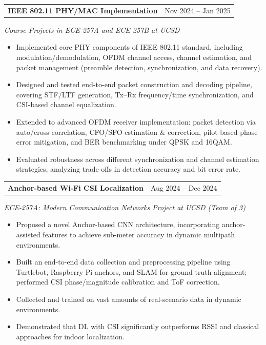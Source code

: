 \documentclass[10pt, letterpaper]{article}
\makeatletter
\newenvironment{highlights}{
    \begin{itemize}[
        topsep=0.10 cm,
        parsep=0.10 cm,
        partopsep=0pt,
        itemsep=0pt,
        leftmargin=0.4 cm + 10pt
    ]
}{
    \end{itemize}
} %
\newenvironment{projectentry}[3]{%
  \onecolentry
  \begin{tabular*}{\textwidth}{@{\extracolsep{\fill}} l r}
    \textbf{#1} & #2 \\
  \end{tabular*}
  \textit{#3} \par
  \vspace{0.2em} %
}{%
  \endonecolentry
}
\makeatother
\begin{document}
\begin{projectentry}{IEEE 802.11 PHY/MAC Implementation}{Nov 2024 -- Jan 2025}{Course Projects in ECE 257A and ECE 257B at UCSD}
    \begin{highlights}
        \item Implemented core PHY components of IEEE 802.11 standard, including modulation/demodulation, OFDM channel access, channel estimation, and packet management (preamble detection, synchronization, and data recovery).  
        \item Designed and tested end-to-end packet construction and decoding pipeline, covering STF/LTF generation, Tx–Rx frequency/time synchronization, and CSI-based channel equalization.  
        \item Extended to advanced OFDM receiver implementation: packet detection via auto/cross-correlation, CFO/SFO estimation \& correction, pilot-based phase error mitigation, and BER benchmarking under QPSK and 16QAM.  
        \item Evaluated robustness across different synchronization and channel estimation strategies, analyzing trade-offs in detection accuracy and bit error rate.
    \end{highlights}
\end{projectentry}



\begin{projectentry}{Anchor-based Wi-Fi CSI Localization}{Aug 2024 -- Dec 2024}{ECE-257A: Modern Communication Networks Project at UCSD (Team of 3)}
    \begin{highlights}
        \item Proposed a novel Anchor-based CNN architecture, incorporating anchor-assisted features to achieve sub-meter accuracy in dynamic multipath environments. 
        \item Built an end-to-end data collection and preprocessing pipeline using Turtlebot, Raspberry Pi anchors, and SLAM for ground-truth alignment; performed CSI phase/magnitude calibration and ToF correction.
        \item Collected and trained on vast amounts of real‑scenario data in dynamic environments.
        \item Demonstrated that DL with CSI significantly outperforms RSSI and classical approaches for indoor localization.
    \end{highlights}
\end{projectentry}
\end{document}
